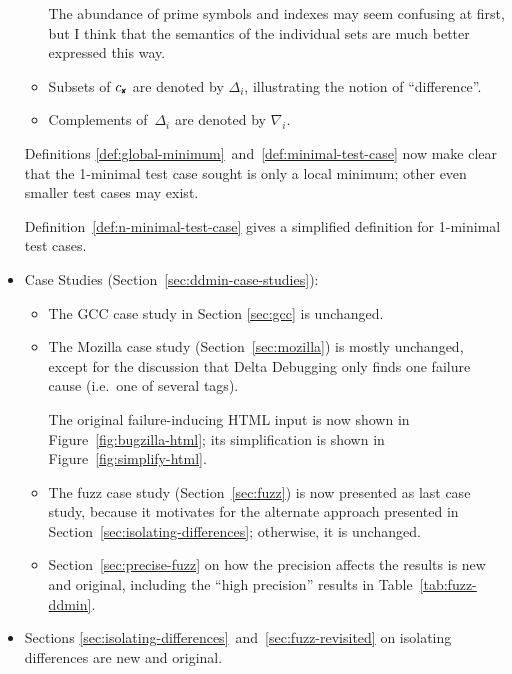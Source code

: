 \documentclass{acm_proc_article-sp}
\newcommand{\GCC}        {{\small GCC}\xspace}
\newcommand{\HTML}       {{\small HTML}\xspace}
\newcommand{\FAIL}{\text{\ding{56}}\xspace}
\newcommand{\cfail}{{c_{\scriptscriptstyle \FAIL}}}
\newcommand{\codeid}[1]{\text{\upshape\texttt{#1}}}
\def\<#1>{\codeid{#1}}
\theoremstyle{plain}
\begin{document}
\begin{itemize}
\begin{itemize}
    The abundance of prime symbols and indexes may seem confusing at
    first, but I think that the semantics of the individual sets are
    much better expressed this way.

  \item Subsets of $\cfail$ are denoted by $\Delta_i$, illustrating the
    notion of ``difference''.

  \item Complements of~$\Delta_i$ are denoted by $\nabla_i$.
  \end{itemize}
  
  Definitions \ref{def:global-minimum}~and~\ref{def:minimal-test-case}
  now make clear that the 1-minimal test case sought is only a local
  minimum; other even smaller test cases may exist.
  
  Definition~\ref{def:n-minimal-test-case} gives a simplified
  definition for 1-minimal test cases.
  
\item Case Studies (Section~\ref{sec:ddmin-case-studies}):

\begin{itemize}
\item The \GCC case study in Section \ref{sec:gcc} is unchanged.
  
\item The Mozilla case study (Section~\ref{sec:mozilla}) is mostly
  unchanged, except for the discussion that Delta Debugging only finds
  one failure cause (i.e.\ one of several \<SELECT> tags).

  The original failure-inducing \HTML input is now shown in
  Figure~\ref{fig:bugzilla-html}; its simplification is shown
  in Figure~\ref{fig:simplify-html}.
  
\item The fuzz case study (Section~\ref{sec:fuzz}) is now presented as
  last case study, because it motivates for the alternate approach
  presented in Section~\ref{sec:isolating-differences}; otherwise, it
  is unchanged.
  
\item Section~\ref{sec:precise-fuzz} on how the precision affects the
  results is new and original, including the ``high precision''
  results in Table~\ref{tab:fuzz-ddmin}.
\end{itemize}

\item Sections
  \ref{sec:isolating-differences}~and~\ref{sec:fuzz-revisited} on
  isolating differences are new and original.
  

\end{itemize}
\end{document}
